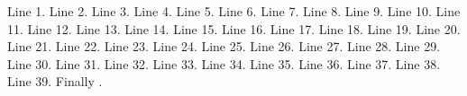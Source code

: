 \documentclass{article}
\begin{document}
Line 1.
Line 2.
Line 3.
Line 4.
Line 5.
Line 6.
Line 7.
Line 8.
Line 9.
Line 10.
Line 11.
Line 12.
Line 13.
Line 14.
Line 15.
Line 16.
Line 17.
Line 18.
Line 19.
Line 20.
Line 21.
Line 22.
Line 23.
Line 24.
Line 25.
Line 26.
Line 27.
Line 28.
Line 29.
Line 30.
Line 31.
Line 32.
Line 33.
Line 34.
Line 35.
Line 36.
Line 37.
Line 38.
Line 39.
Finally \foo.
\end{document}
